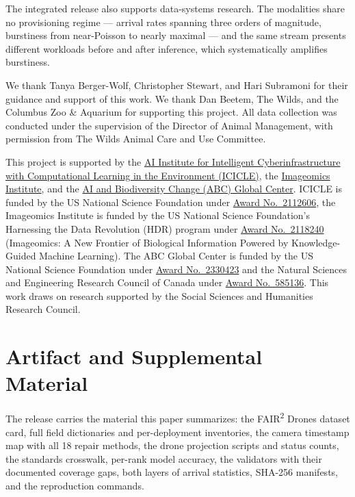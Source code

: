 \documentclass[sigconf]{acmart}
\begin{document}
The integrated release also supports data-systems research. The
modalities share no provisioning regime --- arrival rates spanning three
orders of magnitude, burstiness from near-Poisson to nearly maximal ---
and the same stream presents different workloads before and after
inference, which systematically amplifies burstiness.

\begin{acks}
We thank Tanya Berger-Wolf, Christopher Stewart, and Hari Subramoni for
their guidance and support of this work. We thank Dan Beetem, The Wilds, and the Columbus Zoo \& Aquarium for
supporting this project. All data collection was conducted under the
supervision of the Director of Animal Management, with permission from
The Wilds Animal Care and Use Committee.

This project is supported by the \href{https://icicle.osu.edu/}{AI
Institute for Intelligent Cyberinfrastructure with Computational
Learning in the Environment (ICICLE)}, the
\href{https://imageomics.org/}{Imageomics Institute}, and the
\href{http://abcresearchcenter.org/}{AI and Biodiversity Change (ABC)
Global Center}. ICICLE is funded by the US National Science Foundation
under
\href{https://www.nsf.gov/awardsearch/showAward?AWD_ID=2112606}{Award
No.\ 2112606}, the Imageomics Institute is funded by the US National
Science Foundation's Harnessing the Data Revolution (HDR) program under
\href{https://www.nsf.gov/awardsearch/showAward?AWD_ID=2118240}{Award
No.\ 2118240} (Imageomics: A New Frontier of Biological Information
Powered by Knowledge-Guided Machine Learning). The ABC Global Center is
funded by the US National Science Foundation under
\href{https://www.nsf.gov/awardsearch/showAward?AWD_ID=2330423&HistoricalAwards=false}{Award
No.\ 2330423} and the Natural Sciences and Engineering Research Council
of Canada under
\href{https://www.nserc-crsng.gc.ca/ase-oro/Details-Detailles_eng.asp?id=782440}{Award
No.\ 585136}. This work draws on research supported by the Social
Sciences and Humanities Research Council.
\end{acks}

\section*{Artifact and Supplemental Material}

The release carries the material this paper summarizes: the
FAIR\textsuperscript{2} Drones dataset card, full field dictionaries and
per-deployment inventories, the camera timestamp map with all 18 repair
methods, the drone projection scripts and status counts, the standards
crosswalk, per-rank model accuracy, the validators with their documented
coverage gaps, both layers of arrival statistics, SHA-256 manifests, and
the reproduction commands.



\end{document}
